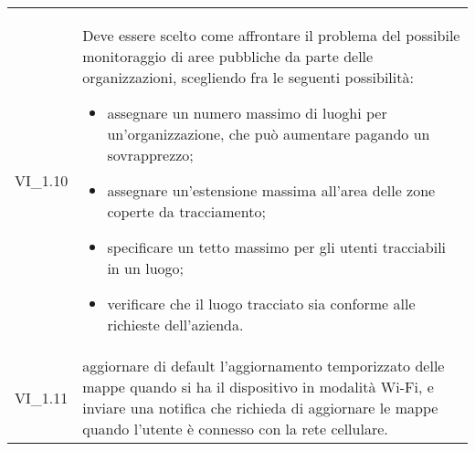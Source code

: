 {\begin{longtable}{ >{\centering}p{} >{}p{}}
	VI\_1.10 & Deve essere scelto come affrontare il problema del possibile monitoraggio di aree pubbliche da parte delle organizzazioni, scegliendo fra le seguenti possibilità:
	\begin{itemize}
		\item assegnare un numero massimo di luoghi per un'organizzazione, che può aumentare pagando un sovrapprezzo;
		\item assegnare un'estensione massima all'area delle zone coperte da tracciamento;
		\item specificare un tetto massimo per gli utenti tracciabili in un luogo;
		\item verificare che il luogo tracciato sia conforme alle richieste dell'azienda.
	\end{itemize} \mbox{} \\
	VI\_1.11 & aggiornare di default l’aggiornamento temporizzato delle mappe quando si ha il dispositivo in modalità Wi-Fi, e inviare una notifica che richieda di aggiornare le mappe quando l’utente è connesso con la rete cellulare. \\
\end{longtable}
}

